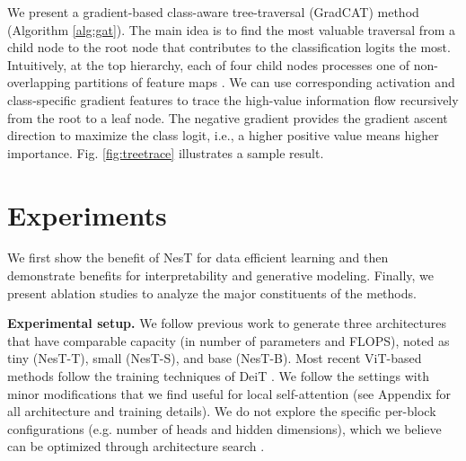 \documentclass{article}
\newcommand{\topic}[1]{\noindent \textbf{#1}}
\newcommand{\OURS}{NesT\xspace}
\begin{document}
We present a gradient-based class-aware tree-traversal (GradCAT) method (Algorithm \ref{alg:gat}). 
The main idea is to find the most valuable traversal from a child node to the root node that contributes to the classification logits the most. Intuitively, at the top hierarchy, each of four child nodes processes one of  non-overlapping partitions of feature maps . 
We can use corresponding activation and class-specific gradient features to trace the high-value information flow recursively from the root to a leaf node. 
The negative gradient  provides the gradient ascent direction to maximize the class  logit, i.e., a higher positive value means higher importance. 
Fig. \ref{fig:treetrace} illustrates a sample result. 


\section{Experiments}

We first show the benefit of \OURS for data efficient learning and then demonstrate benefits for interpretability and generative modeling. Finally, we present ablation studies to analyze the major constituents of the methods.



\topic{Experimental setup.}  We follow previous work \cite{dosovitskiy2020image} to generate three architectures that have comparable capacity (in number of parameters and FLOPS), noted as tiny (\OURS-T), small (\OURS-S), and base (\OURS-B). 
Most recent ViT-based methods follow the training techniques of DeiT \cite{touvron2020training}.
We follow the settings with minor modifications that we find useful for local self-attention (see Appendix for all architecture and training details).
We do not explore the specific per-block configurations (e.g. number of heads and hidden dimensions), which we believe can be optimized through architecture search \cite{tan2019efficientnet}.
\end{document}
